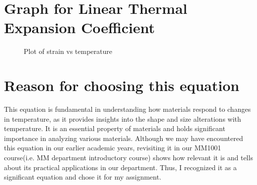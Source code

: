 \documentclass[12pt,a4paper]{article}
\begin{document}
\section{Graph for Linear Thermal Expansion Coefficient }
\cite{Allvar}
\begin{figure}[H]
    \begin{center}
    \end{center}
    \caption{Plot of strain vs temperature}
\end{figure}

\section{Reason for choosing this equation}
 
This equation is fundamental in understanding how materials respond to changes in temperature, as it provides insights into the shape and size alterations with temperature. It is an essential property of materials and holds significant importance in analyzing various materials. Although we may have encountered this equation in our earlier academic years, revisiting it in our MM1001 course(i.e. MM department introductory course) shows how relevant it is and tells about its practical applications in our department. Thus, I recognized it as a significant equation and chose it for my assignment.



\end{document}
